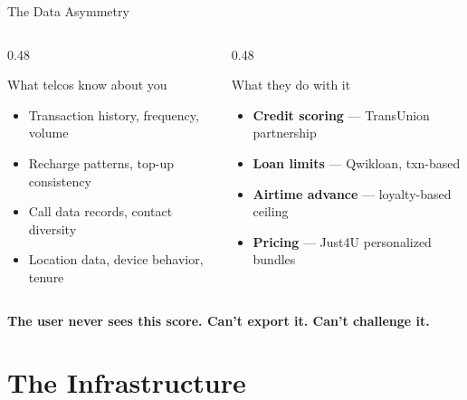 \documentclass[aspectratio=169, 11pt]{beamer}
\begin{document}
\begin{frame}{The Data Asymmetry}
\small
\begin{columns}[T]
\begin{column}{0.48\textwidth}
\begin{block}{What telcos know about you}
\begin{itemize}\setlength{\itemsep}{2pt}
  \item Transaction history, frequency, volume
  \item Recharge patterns, top-up consistency
  \item Call data records, contact diversity
  \item Location data, device behavior, tenure
\end{itemize}
\end{block}
\end{column}
\begin{column}{0.48\textwidth}
\begin{block}{What they do with it}
\begin{itemize}\setlength{\itemsep}{2pt}
  \item \textbf{Credit scoring} --- TransUnion partnership
  \item \textbf{Loan limits} --- Qwikloan, txn-based
  \item \textbf{Airtime advance} --- loyalty-based ceiling
  \item \textbf{Pricing} --- Just4U personalized bundles
\end{itemize}
\end{block}
\end{column}
\end{columns}

\vspace{0.6cm}
\centering
\textcolor{mpRed}{\textbf{The user never sees this score. Can't export it. Can't challenge it.}}
\end{frame}

\section{The Infrastructure}
\end{document}
